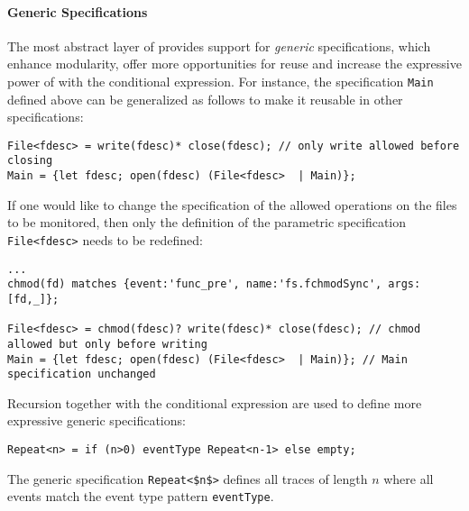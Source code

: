 
\paragraph{Generic Specifications}
The most abstract layer of \rml provides support for \emph{generic} specifications,
which enhance modularity, offer more opportunities for reuse and increase the expressive power of \rml with the conditional expression.
For instance, the specification \lstinline{Main} defined above
can be generalized as follows to make it reusable in other specifications:
\begin{lstlisting}[basicstyle=\ttfamily\footnotesize]
File<fdesc> = write(fdesc)* close(fdesc); // only write allowed before closing 
Main = {let fdesc; open(fdesc) (File<fdesc>  | Main)};
\end{lstlisting}
If one would like to change the specification of the allowed operations on the files to be monitored, then only the definition
of the parametric specification \lstinline{File<fdesc>} needs to be redefined:
\begin{lstlisting}[basicstyle=\ttfamily\footnotesize]
...
chmod(fd) matches {event:'func_pre', name:'fs.fchmodSync', args:[fd,_]};

File<fdesc> = chmod(fdesc)? write(fdesc)* close(fdesc); // chmod allowed but only before writing
Main = {let fdesc; open(fdesc) (File<fdesc>  | Main)}; // Main specification unchanged
\end{lstlisting}
Recursion together with the conditional expression are used to define more expressive generic specifications:
\begin{lstlisting}[basicstyle=\ttfamily\footnotesize]
Repeat<n> = if (n>0) eventType Repeat<n-1> else empty;
\end{lstlisting}
The generic specification \lstinline{Repeat<$n$>} defines all traces of length $n$ where all events match
the event type pattern \lstinline{eventType}.
